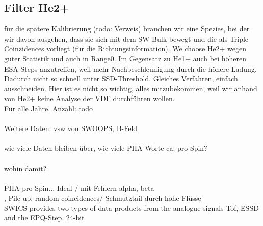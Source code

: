 \subsection{Filter He2+}
für die spätere Kalibrierung (todo: Verweis) brauchen wir eine Spezies, bei der wir davon ausgehen, dass sie sich mit dem SW-Bulk bewegt und die als Triple Coinzidences vorliegt (für die Richtungsinformation). We choose He2+ wegen guter Statistik und auch in Range0. Im Gegensatz zu He1+ auch bei höheren ESA-Steps anzutreffen, weil mehr Nachbeschleunigung durch die höhere Ladung. Dadurch nicht so schnell unter SSD-Threshold. Gleiches Verfahren, einfach ausschneiden. Hier ist es nicht so wichtig, alles mitzubekommen, weil wir anhand von He2+ keine Analyse der VDF durchführen wollen. 
\\
Für alle Jahre. Anzahl: todo
\\ \\
Weitere Daten: vsw von SWOOPS, B-Feld
\\ \\
wie viele Daten bleiben über, wie viele PHA-Worte ca. pro Spin?
\\ \\
wohin damit? \\ \\
PHA pro Spin...
Ideal / mit Fehlern alpha, beta
\\ , Pile-up, random coincidences/ Schmutztail durch hohe Flüsse
\\
SWICS provides two types of data products from the analogue signals Tof, ESSD and the EPQ-Step.
24-bit
%
%
%

